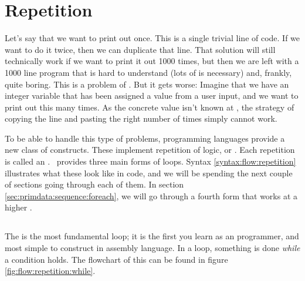 \section{Repetition}
\label{sec:flow:repetition}

Let's say that we want to print out  once. This is a single trivial line of code. If we want to do it twice, then we can duplicate that line. That solution will still technically work if we want to print it out 1000 times, but then we are left with a 1000 line program that is hard to understand (lots of  is necessary) and, frankly, quite boring. This is a problem of . But it gets worse: Imagine that we have an integer variable that has been assigned a value from a user input, and we want to print out  this many times. As the concrete value isn't known at , the strategy of copying the line and pasting the right number of times simply cannot work.

To be able to handle this type of problems, programming languages provide a new class of constructs. These implement repetition of logic, or . Each repetition is called an . \csharp\ provides three main forms of loops. Syntax \ref{syntax:flow:repetition} illustrates what these look like in code, and we will be spending the next couple of sections going through each of them. In section \ref{sec:primdata:sequence:foreach}, we will go through a fourth form that works at a higher .

\begin{syntaxfloat}
  
  \caption{Statements for repetition}
  \label{syntax:flow:repetition}
\end{syntaxfloat}

\subsection{}
\label{sec:flow:repetition:while}

The  is the most fundamental loop; it is the first you learn as an  programmer, and most simple to construct in assembly language. In a  loop, something is done \textsl{while} a condition holds. The flowchart of this can be found in figure \ref{fig:flow:repetition:while}.

